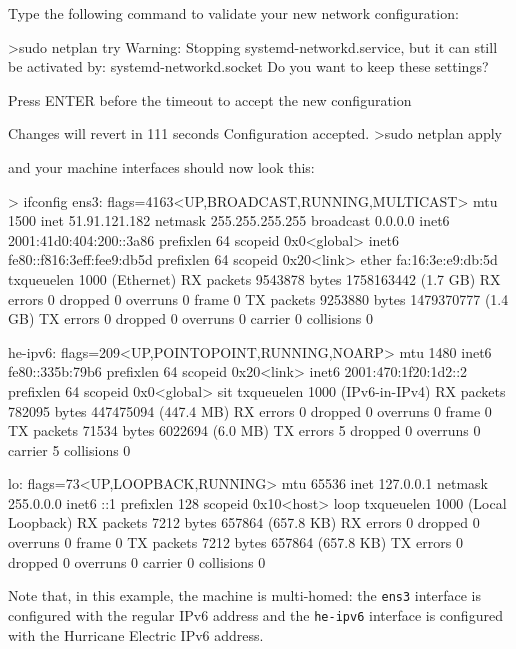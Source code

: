 \noindent 
Type the following command to validate your new network configuration:
\begin{termc}[backgroundcolor=\color{palerod}, basicstyle=\ttfamily\tiny, escapechar=@]
>sudo netplan try
Warning: Stopping systemd-networkd.service, but it can still be activated by:
  systemd-networkd.socket
Do you want to keep these settings?


Press ENTER before the timeout to accept the new configuration


Changes will revert in 111 seconds
Configuration accepted.
>sudo netplan apply
\end{termc}
and your machine interfaces should now look this:



\begin{termc}[backgroundcolor=\color{palerod}, basicstyle=\ttfamily\tiny, escapechar=@]
> ifconfig
ens3: flags=4163<UP,BROADCAST,RUNNING,MULTICAST>  mtu 1500
        inet 51.91.121.182  netmask 255.255.255.255  broadcast 0.0.0.0
        inet6 2001:41d0:404:200::3a86  prefixlen 64  scopeid 0x0<global>
        inet6 fe80::f816:3eff:fee9:db5d  prefixlen 64  scopeid 0x20<link>
        ether fa:16:3e:e9:db:5d  txqueuelen 1000  (Ethernet)
        RX packets 9543878  bytes 1758163442 (1.7 GB)
        RX errors 0  dropped 0  overruns 0  frame 0
        TX packets 9253880  bytes 1479370777 (1.4 GB)
        TX errors 0  dropped 0 overruns 0  carrier 0  collisions 0

he-ipv6: flags=209<UP,POINTOPOINT,RUNNING,NOARP>  mtu 1480
        inet6 fe80::335b:79b6  prefixlen 64  scopeid 0x20<link>
        inet6 2001:470:1f20:1d2::2  prefixlen 64  scopeid 0x0<global>
        sit  txqueuelen 1000  (IPv6-in-IPv4)
        RX packets 782095  bytes 447475094 (447.4 MB)
        RX errors 0  dropped 0  overruns 0  frame 0
        TX packets 71534  bytes 6022694 (6.0 MB)
        TX errors 5  dropped 0 overruns 0  carrier 5  collisions 0

lo: flags=73<UP,LOOPBACK,RUNNING>  mtu 65536
        inet 127.0.0.1  netmask 255.0.0.0
        inet6 ::1  prefixlen 128  scopeid 0x10<host>
        loop  txqueuelen 1000  (Local Loopback)
        RX packets 7212  bytes 657864 (657.8 KB)
        RX errors 0  dropped 0  overruns 0  frame 0
        TX packets 7212  bytes 657864 (657.8 KB)
        TX errors 0  dropped 0 overruns 0  carrier 0  collisions 0
\end{termc}

Note that, in this example, the machine is multi-homed: the \texttt{ens3} interface is configured with the regular IPv6 address and the \texttt{he-ipv6} interface is configured with the Hurricane Electric IPv6 address. 

